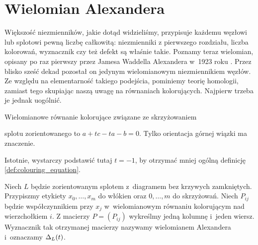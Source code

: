 \section{Wielomian Alexandera} %

Większość niezmienników, jakie dotąd widzieliśmy, przypisuje każdemu węzłowi lub splotowi pewną liczbę całkowitą: niezmienniki z pierwszego rozdziału, liczba kolorowań, wyznacznik czy też defekt są właśnie takie.
Poznamy teraz wielomian, opisany po raz pierwszy przez Jamesa Waddella Alexandera w~1923 roku \cite{alexander23}.
Przez blisko sześć dekad pozostał on jedynym wielomianowym niezmiennikiem węzłów.
Ze względu na elementarność takiego podejścia, pominiemy teorię homologii, zamiast tego skupiając naszą uwagę na równaniach kolorujących.
Najpierw trzeba je jednak uogólnić.

\begin{definition}
    Wielomianowe równanie kolorujące związane ze skrzyżowaniem
\begin{comment}
    \[\begin{tikzpicture}[baseline=-0.65ex, scale=0.12]
    \useasboundingbox (-5, -5) rectangle (5,5);
    \begin{knot}[clip width=5, end tolerance=1pt, flip crossing/.list={1}]
        \strand[semithick] (-5,5) to (5,-5);
        \strand[semithick,-Latex] (-5,-5) to (5,5);
        \node[darkblue] at (5, 5)[below right] {$a$};
        \node[darkblue] at (5, -5)[above right] {$b$};
        \node[darkblue] at (-5, 5)[below left] {$c$};
    \end{knot}
    \end{tikzpicture}\]
\end{comment}
    splotu zorientowanego to $a + tc - ta - b = 0$.
    Tylko orientacja górnej wiązki ma znaczenie.
\end{definition}

Istotnie, wystarczy podstawić tutaj $t = -1$, by otrzymać mniej ogólną definicję \ref{def:colouring_equation}.

\begin{definition}
    \label{def:alexander_polynomial}
    Niech $L$ będzie zorientowanym splotem z~diagramem bez krzywych zamkniętych.
    Przypiszmy etykiety $x_0, \ldots, x_m$ do włókien oraz $0, \ldots, m$ do skrzyżowań.
    Niech $P_{ij}$ będzie współczynnikiem przy $x_j$ w~wielomianowym równaniu kolorującym nad wierzchołkiem $i$.
    Z macierzy $P=(P_{ij})$ wykreślmy jedną kolumnę i~jeden wiersz.
    Wyznacznik tak otrzymanej macierzy nazywamy wielomianem Alexandera i~oznaczamy $\Delta_L(t)$.
\end{definition}

